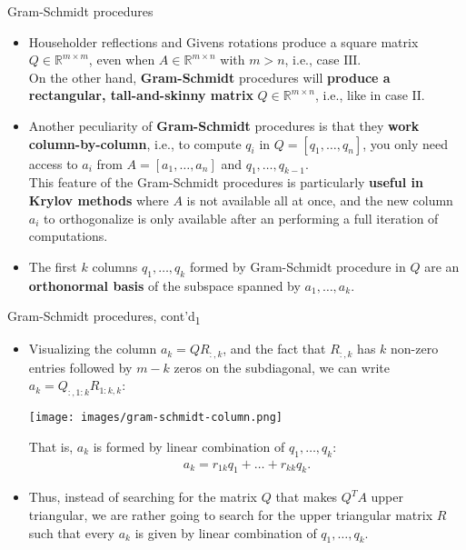 \documentclass[t,usepdftitle=false]{beamer}
\begin{document}
\begin{frame}{Gram-Schmidt procedures}
\begin{itemize}
\item Householder reflections and Givens rotations produce a square matrix $Q\in\mathbb{R}^{m\times m}$, even when $A\in\mathbb{R}^{m\times n}$ with $m>n$, i.e., case $\mathrm{III}$.\vspace{.1cm}\\
On the other hand, \textbf{Gram-Schmidt} procedures will \textbf{produce a rectangular, tall-and-skinny matrix} $Q\in\mathbb{R}^{m\times n}$, i.e., like in case $\textrm{II}$.
\item Another peculiarity of \textbf{Gram-Schmidt} procedures is that they \textbf{work column-by-column}, i.e., to compute $q_i$ in $Q=[q_1,\dots,q_n]$, you only need access to $a_i$ from $A=[a_1,\dots,a_n]$ and $q_1,\dots,q_{k-1}$.\vspace{.1cm}\\
This feature of the Gram-Schmidt procedures is particularly \textbf{useful in Krylov methods} where $A$ is not available all at once, and the new column $a_i$ to orthogonalize is only available after an performing a full iteration of computations.
\item The first $k$ columns $q_1,\dots,q_k$ formed by Gram-Schmidt procedure in $Q$ are an \textbf{orthonormal basis} of the subspace spanned by $a_1,\dots,a_k$.
\end{itemize}
\end{frame}

\begin{frame}{Gram-Schmidt procedures, cont'd\textsubscript{1}}
\begin{itemize}
\item Visualizing the column $a_k=QR_{:,k}$, and the fact that $R_{:,k}$ has $k$ non-zero entries followed by $m-k$ zeros on the subdiagonal, we can write $a_k=Q_{:,1:k}R_{1:k,k}$:
\begin{center}
\vspace{.2cm}
\texttt{[image: images/gram-schmidt-column.png]}
\end{center}
That is, $a_k$ is formed by linear combination of $q_1,\dots,q_k$:
\begin{align*}
a_k=r_{1k}q_1+\dots+r_{kk}q_k.
\end{align*}
\item Thus, instead of searching for the matrix $Q$ that makes $Q^TA$ upper triangular, we are rather going to search for the upper triangular matrix $R$ such that every $a_k$ is given by linear combination of $q_1,\dots,q_k$.
\end{itemize}
\end{frame}
\end{document}
